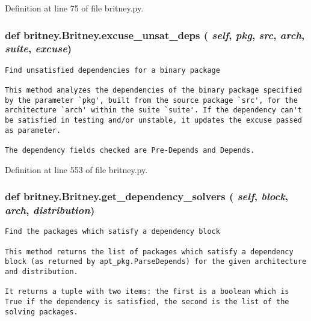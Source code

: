 Definition at line 75 of file britney.py.
\subsubsection{\setlength{\rightskip}{0pt plus 5cm}def britney.Britney.excuse\_\-unsat\_\-deps ( {\em self},  {\em pkg},  {\em src},  {\em arch},  {\em suite},  {\em excuse})}\label{classbritney_1_1Britney_f51c60a69f3a9dc2bc5afdb2ffaf3990}




\footnotesize\begin{verbatim}Find unsatisfied dependencies for a binary package

This method analyzes the dependencies of the binary package specified
by the parameter `pkg', built from the source package `src', for the
architecture `arch' within the suite `suite'. If the dependency can't
be satisfied in testing and/or unstable, it updates the excuse passed
as parameter.

The dependency fields checked are Pre-Depends and Depends.
\end{verbatim}
\normalsize
 

Definition at line 553 of file britney.py.
\subsubsection{\setlength{\rightskip}{0pt plus 5cm}def britney.Britney.get\_\-dependency\_\-solvers ( {\em self},  {\em block},  {\em arch},  {\em distribution})}\label{classbritney_1_1Britney_5461f49e3e75a251ebedfd37d2a5ff0c}




\footnotesize\begin{verbatim}Find the packages which satisfy a dependency block

This method returns the list of packages which satisfy a dependency
block (as returned by apt_pkg.ParseDepends) for the given architecture
and distribution.

It returns a tuple with two items: the first is a boolean which is
True if the dependency is satisfied, the second is the list of the
solving packages.
\end{verbatim}
\normalsize
 

